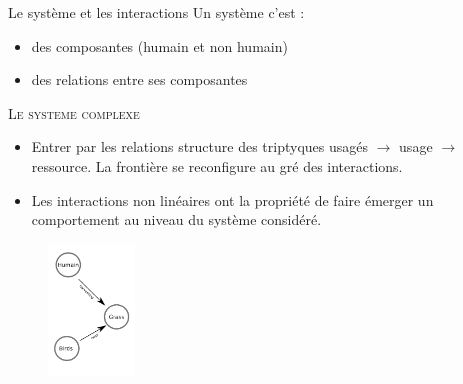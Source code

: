 \documentclass[newPxFont]{beamer}
\begin{document}
\begin{frame}[c]{Le système et les interactions}
\vspace{-1cm}
Un système c'est :
\begin{itemize}
  \item des composantes (humain et non humain)
  \item des relations entre ses composantes
\end{itemize}

\small{
  \begin{alertblock}{\textsc{Le systeme complexe}}
      \begin{itemize}
        \item Entrer par les relations structure des triptyques usagés $\rightarrow$ usage $\rightarrow$ ressource. La frontière se reconfigure au gré des interactions.
        \item Les interactions non linéaires ont la propriété de faire émerger un comportement au niveau du système considéré.
      \end{itemize}

  \end{alertblock}
}
\begin{figure}
  \includegraphics[height=3.5cm]{img/ReHab_network.png}
\end{figure}

\end{frame}
\end{document}
